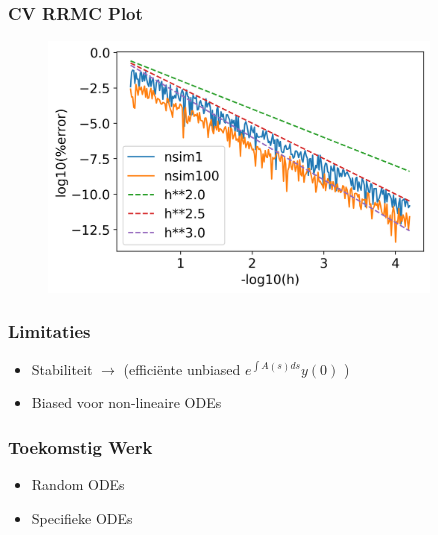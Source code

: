 \documentclass[18pt,aspectratio=149]{beamer}
\begin{document}
\begin{frame}
    \frametitle{CV RRMC Plot}
    \begin{figure}[h]
        \centering
        \includegraphics[width=0.9\textwidth]{imgs/CV RRMC IVP.png}
    \end{figure}
\end{frame}

\begin{frame}
    \frametitle{Limitaties}
    \begin{itemize}
        \item Stabiliteit $\rightarrow$ \cite{kettunen_unbiased_2021}
              (efficiënte unbiased $e^{\int A(s) ds } y(0)$ )
        \item Biased voor non-lineaire ODEs
    \end{itemize}
\end{frame}

\begin{frame}
    \frametitle{Toekomstig Werk}
    \begin{itemize}
        \item Random ODEs
        \item Specifieke ODEs
    \end{itemize}
\end{frame}

\end{document}
